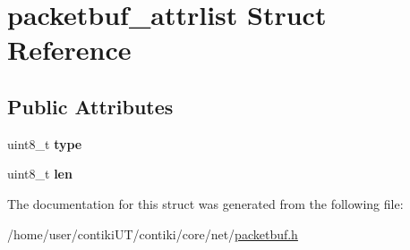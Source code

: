 \hypertarget{structpacketbuf__attrlist}{}\section{packetbuf\+\_\+attrlist Struct Reference}
\label{structpacketbuf__attrlist}
\subsection*{Public Attributes}
\begin{DoxyCompactItemize}
\item 
\hypertarget{structpacketbuf__attrlist_aadccbe340bc482df5c23142e03f635fa}{}uint8\+\_\+t {\bfseries type}\label{structpacketbuf__attrlist_aadccbe340bc482df5c23142e03f635fa}

\item 
\hypertarget{structpacketbuf__attrlist_a27b675abf2fef797a1f98afc7740d493}{}uint8\+\_\+t {\bfseries len}\label{structpacketbuf__attrlist_a27b675abf2fef797a1f98afc7740d493}

\end{DoxyCompactItemize}


The documentation for this struct was generated from the following file\+:\begin{DoxyCompactItemize}
\item 
/home/user/contiki\+U\+T/contiki/core/net/\hyperlink{packetbuf_8h}{packetbuf.\+h}\end{DoxyCompactItemize}
